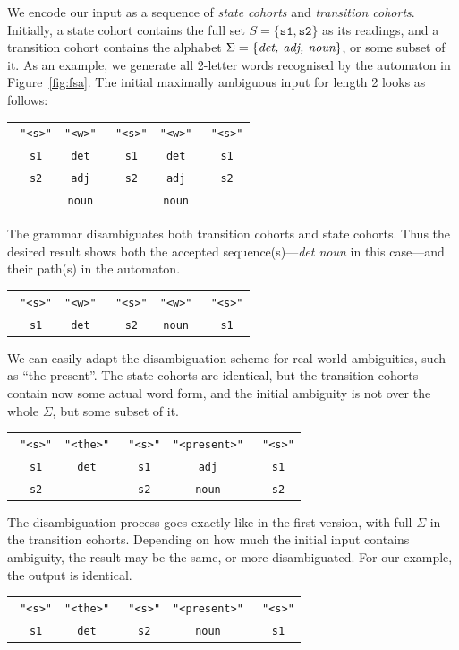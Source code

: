 \documentclass[11pt]{article}
\def\t#1{\texttt{#1}}
\def\h#1{{\tt \color{gray} #1}}
\def\swf{\h{"<s>"}}
\def\exampleWord{{present}}
\begin{document}
We encode our input as a sequence of \emph{state cohorts} and \emph{transition cohorts}.
Initially, a state cohort contains the full set $S = \{\t{s1}, \t{s2}\}$ as
its readings, and a transition cohort contains the alphabet $\Sigma =
\{\emph{det, adj, noun}\}$, or some subset of it. As an example, we
generate all 2-letter words recognised by the automaton in
Figure~\ref{fig:fsa}. The initial maximally ambiguous input for length
2 looks as follows:
%
\begin{center}
  \renewcommand{\tabcolsep}{2.5pt}
  \begin{tabular}{ccccc}
    \swf   & \t{"<w>"}  & \swf   & \t{"<w>"} & \swf   \\ 
    \h{s1} & \t{det}      & \h{s1} & \t{det} & \h{s1} \\
    \h{s2} & \t{adj}      & \h{s2} & \t{adj} & \h{s2} \\
           & \t{noun}     &        & \t{noun} &               
  \end{tabular}
\end{center}
%
\noindent 
The grammar disambiguates both transition cohorts and state cohorts. Thus
the desired result shows both the accepted sequence(s)---\emph{det noun}
in this case---and their path(s) in the automaton.
%
\begin{center}
  \renewcommand{\tabcolsep}{2.5pt}
  \begin{tabular}{ccccc}
    \swf   & \t{"<w>"}  & \swf   & \t{"<w>"} & \swf   \\ 
    \h{s1} & \t{det}    & \h{s2} & \t{noun}  & \h{s1}       
  \end{tabular}
\end{center}
%
We can easily adapt the disambiguation scheme for real-world
ambiguities, such as ``the \exampleWord{}''. The state cohorts are identical, but the transition
cohorts contain now some actual word form, and the initial ambiguity
is not over the whole $\Sigma$, but some subset of it.
%
\begin{center}
  \renewcommand{\tabcolsep}{2.5pt}
  \begin{tabular}{ccccc}
    \swf   & \t{"<the>"}  & \swf   & \t{"<\exampleWord{}>"} & \swf    \\ 
    \h{s1} & \t{det}      & \h{s1} & \t{adj}   & \h{s1}  \\
    \h{s2} &              & \h{s2} & \t{noun}  & \h{s2}     
  \end{tabular}
\end{center}
%
The disambiguation process goes exactly like in the first version, with full
$\Sigma$ in the transition cohorts.
Depending on how much the initial input contains ambiguity, the
result may be the same, or more disambiguated. For our example, the
output is identical.
\begin{center}
  \renewcommand{\tabcolsep}{2.5pt}
  \begin{tabular}{ccccc}
    \swf   & \t{"<the>"}  & \swf   & \t{"<\exampleWord{}>"} & \swf    \\ 
    \h{s1} & \t{det}      & \h{s2} & \t{noun} & \h{s1}  \\
  \end{tabular}
\end{center}
%
%
\end{document}
